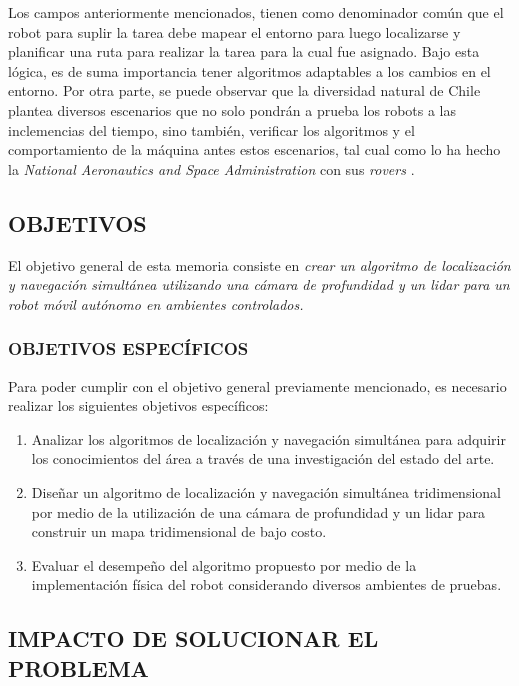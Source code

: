 Los campos anteriormente mencionados, tienen como denominador común que el robot para suplir la tarea debe mapear el entorno para luego localizarse y planificar una ruta para realizar la tarea para la cual fue asignado. Bajo esta lógica, es de suma importancia tener algoritmos adaptables a los cambios en el entorno. Por otra parte, se puede observar que la diversidad natural de Chile plantea diversos escenarios que no solo pondrán a prueba los robots a las inclemencias del tiempo, sino también, verificar los algoritmos y el comportamiento de la máquina antes estos escenarios, tal cual como lo ha hecho la \textit{National Aeronautics and Space Administration} con sus \textit{rovers} \cite{wei_autonomous_2015}.

\newpage
\subsection{OBJETIVOS}

El objetivo general de esta memoria consiste en \textit{crear un algoritmo de localización y navegación simultánea utilizando una cámara de profundidad y un lidar para un robot móvil autónomo en ambientes controlados.
}

\subsubsection{OBJETIVOS ESPECÍFICOS}
Para poder cumplir con el objetivo general previamente mencionado, es necesario realizar los siguientes objetivos específicos:
\begin{enumerate}
    \item Analizar los algoritmos de localización y navegación simultánea para adquirir los conocimientos del área a través de una investigación del estado del arte.
    
    \item Diseñar un algoritmo de localización y navegación simultánea tridimensional por medio de la utilización de una cámara de profundidad y un lidar para construir un mapa tridimensional de bajo costo.
    
    \item Evaluar el desempeño del algoritmo propuesto por medio de la implementación física del robot considerando diversos ambientes de pruebas.
\end{enumerate}

\newpage
\subsection{IMPACTO DE SOLUCIONAR EL PROBLEMA}


